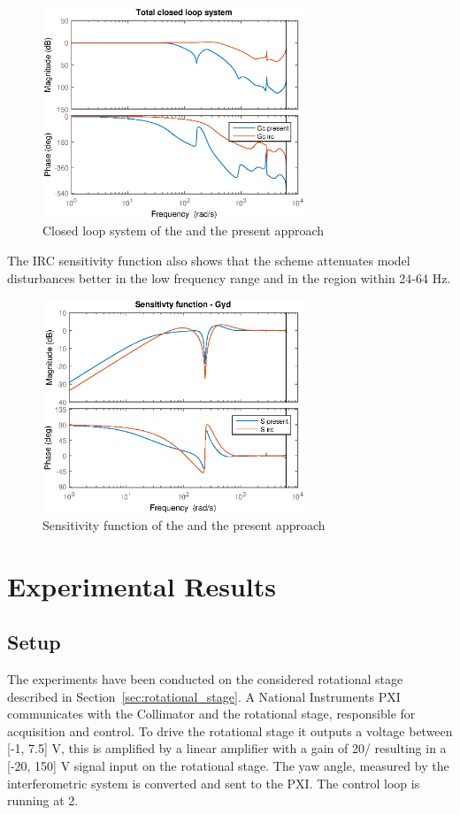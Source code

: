 \begin{figure}[h!]
  \centering
  \includegraphics[width=0.7\textwidth]{fig/matlab/totalclosedloop.eps}
  \caption{\label{fig:irc_totalclosed} Closed loop system of the \abbrIRC and the present approach}
\end{figure}

The IRC sensitivity function also shows that the \abbrIRC scheme attenuates model disturbances better in the low frequency range and in the region within 24-64 Hz.


\begin{figure}[h!]
  \centering
  \includegraphics[width=0.7\textwidth]{fig/matlab/sensitivity_irc.eps}
  \caption{\label{fig:sensitivity_irc} Sensitivity function of the \abbrIRC and the present approach}
\end{figure}


\newpage
\section{Experimental Results}
\subsection{Setup}
The experiments have been conducted on the considered rotational stage described in Section~\ref{sec:rotational_stage}. A National Instruments PXI communicates with the Collimator and the rotational stage, responsible for acquisition and control. To drive the rotational stage it outputs a voltage between [-1, 7.5] V, this is amplified by a linear amplifier with a gain of \unit{20}{\volt/\volt} resulting in a [-20, 150] V signal input on the rotational stage. The yaw angle, measured by the interferometric system is converted and sent to the PXI. The control loop is running at \unit{2}{\kilo\hertz}.
